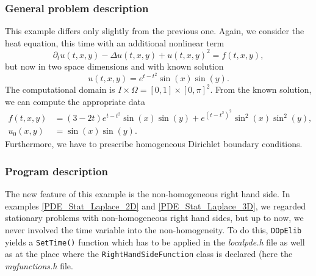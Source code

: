 \subsubsection{General problem description}

This example differs only slightly from the previous one. Again, we consider the heat equation, this time with an additional nonlinear term
\begin{equation*}
\partial_t u(t,x,y) - \Delta u(t,x,y) + u(t,x,y)^2 = f(t,x,y),
\end{equation*}
but now in two space dimensions and with known solution 
\begin{equation*}
u(t,x,y) = e^{t-t^2} \sin(x) \sin(y).
\end{equation*}
The computational domain is $I\times\Omega = [0,1]\times [0,\pi]^2$. From the known solution, we can compute the appropriate data 
\begin{align*}
f(t,x,y) &= (3-2t)e^{t-t^2} \sin(x) \sin(y) + e^{(t-t^2)^2} \sin^2(x) \sin^2(y),\\
u_0(x,y) &= \sin(x) \sin(y).
\end{align*}
Furthermore, we have to prescribe homogeneous Dirichlet boundary conditions.

\subsubsection{Program description}

The new feature of this example is the non-homogeneous right hand side. In examples \ref{PDE_Stat_Laplace_2D} and \ref{PDE_Stat_Laplace_3D}, we regarded stationary problems with non-homogeneous right hand sides, but up to now, we never involved the time variable into the non-homogeneity. To do this, \texttt{DOpElib} yields a \texttt{SetTime()} function which has to be applied in the \textit{localpde.h} file as well as at the place where the \texttt{RightHandSideFunction} class is declared (here the \textit{myfunctions.h} file.
